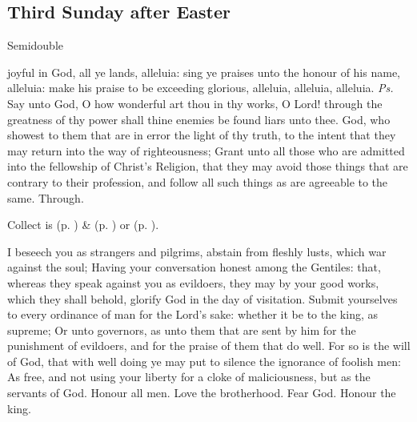 \clearpage
\subsection{Third Sunday after Easter}
\begin{inhead}
    {Semidouble}
\end{inhead}


\introit
{} joyful in God, all ye lands, alleluia: sing ye praises unto the honour of his name, alleluia: make his praise to be exceeding glorious, alleluia, alleluia, alleluia. \textit{Ps.} Say unto God, O how wonderful art thou in thy works, O Lord! through the greatness of thy power shall thine enemies be found liars unto thee.
\collect
{} God, who showest to them that are in error the light of thy truth, to the intent that they may return into the way of righteousness; Grant unto all those who are admitted into the fellowship of Christ's Religion, that they may avoid those things that are contrary to their profession, and follow all such things as are agreeable to the same. Through.
\begin{rubric}
     Collect is  (p. \pageref{SPMaryInEaster}) \&   (p. \pageref{SPAgainst}) or  (p. \pageref{SPChiefBishop}).
\end{rubric}
 I beseech you as strangers and pilgrims, abstain from fleshly lusts, which war against the soul; Having your conversation honest among the Gentiles: that, whereas they speak against you as evildoers, they may by your good works, which they shall behold, glorify God in the day of visitation. Submit yourselves to every ordinance of man for the Lord's sake: whether it be to the king, as supreme; Or unto governors, as unto them that are sent by him for the punishment of evildoers, and for the praise of them that do well. For so is the will of God, that with well doing ye may put to silence the ignorance of foolish men: As free, and not using your liberty for a cloke of maliciousness, but as the servants of God. Honour all men. Love the brotherhood. Fear God. Honour the king.

